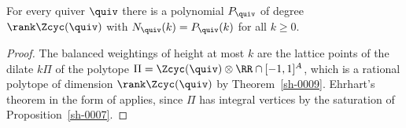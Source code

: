 \begin{theorem}[Counting]\label{sh-000C}
For every quiver $\quiv$ there is a polynomial $P_{\quiv}$ of degree $\rank \Zcyc(\quiv)$ with $N_{\quiv}(k) = P_{\quiv}(k)$ for all $k \geq 0$.
\end{theorem}
\begin{proof}
The balanced weightings of height at most $k$ are the lattice points of the dilate $k \Pi$ of the polytope $\Pi = \Zcyc(\quiv) \otimes \RR \cap [-1,1]^{A}$, which is a rational polytope of dimension $\rank \Zcyc(\quiv)$ by Theorem~\ref{sh-0009}. Ehrhart's theorem in the form of \cite[Theorem 3.2]{Bellamy19} applies, since $\Pi$ has integral vertices by the saturation of Proposition~\ref{sh-0007}.
\end{proof}
